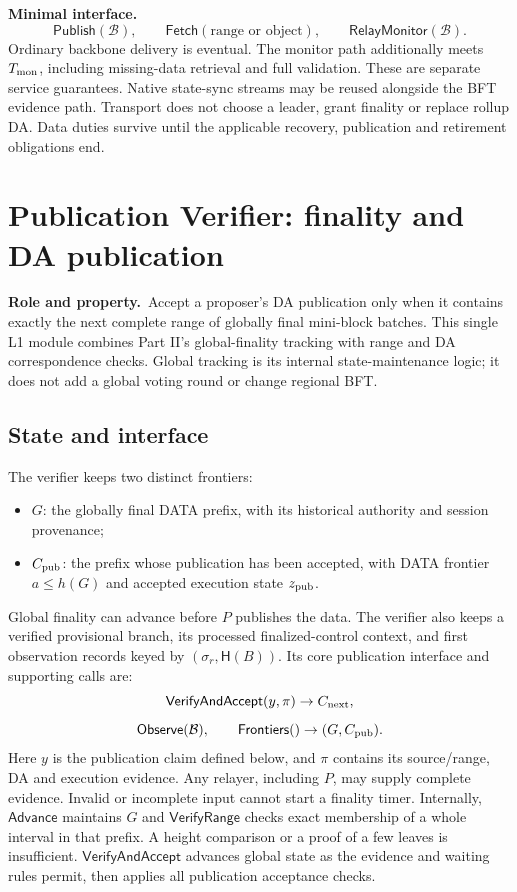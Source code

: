 \documentclass[11pt,a4paper]{article}
\newcommand{\api}[1]{\ensuremath{\mathsf{#1}}}
\newcommand{\Hash}{\mathsf H}
\newcommand{\role}{\textbf{Role and property.}\ }
\newcommand{\iface}{\textbf{Minimal interface.}\ }
\begin{document}
\iface
\[
 \api{Publish}(\mathcal B),\qquad \api{Fetch}(\text{range or object}),
 \qquad \api{RelayMonitor}(\mathcal B).
\]
Ordinary backbone delivery is eventual. The monitor path additionally
meets $T_{\rm mon}$, including missing-data retrieval and full validation.
These are separate service guarantees. Native state-sync streams may be
reused alongside the BFT evidence path. Transport does not choose a
leader, grant finality or replace rollup DA. Data duties survive until
the applicable recovery, publication and retirement obligations end.

\section{Publication Verifier: finality and DA publication}\label{sec:publication}
\role Accept a proposer's DA publication only when it contains exactly
the next complete range of globally final mini-block batches. This single
L1 module combines Part II's global-finality tracking with range and DA
correspondence checks. Global tracking is its internal state-maintenance
logic; it does not add a global voting round or change regional BFT.

\subsection{State and interface}
The verifier keeps two distinct frontiers:
\begin{itemize}
\item $G$: the globally final DATA prefix, with its historical authority
and session provenance;
\item $C_{\rm pub}$: the prefix whose publication has been accepted,
with DATA frontier $a\le h(G)$ and accepted execution state $z_{\rm pub}$.
\end{itemize}
Global finality can advance before $P$ publishes the data. The verifier
also keeps a verified provisional branch, its processed finalized-control
context, and first observation records keyed by $(\sigma_r,\Hash(B))$.
Its core publication interface and supporting calls are:
\[
 \api{VerifyAndAccept}(y,\pi)\to C_{\rm next},
\]
\[
 \api{Observe}(\mathcal B),\qquad
 \api{Frontiers}()\to(G,C_{\rm pub}).
\]
Here $y$ is the publication claim defined below, and $\pi$ contains its
source/range, DA and execution evidence. Any relayer, including $P$, may
supply complete evidence. Invalid or incomplete input cannot start a
finality timer. Internally, \api{Advance} maintains $G$ and
\api{VerifyRange} checks exact membership of a whole interval in that
prefix. A height comparison or a proof of a few leaves is insufficient.
\api{VerifyAndAccept} advances global state as the evidence and waiting
rules permit, then applies all publication acceptance checks.
\end{document}
